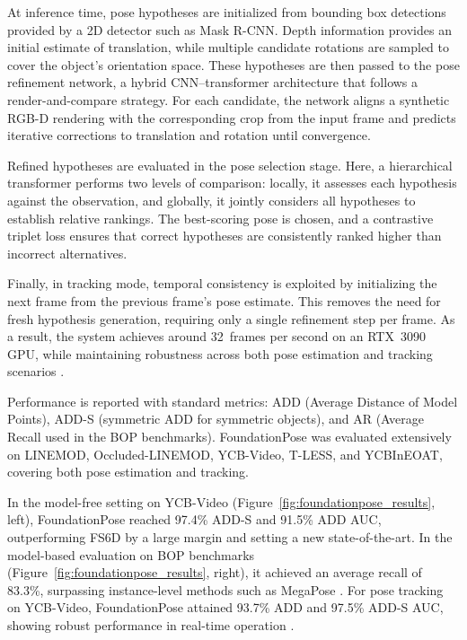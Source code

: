 At inference time, pose hypotheses are initialized from bounding box detections provided by a 2D detector such as Mask R-CNN. Depth information provides an initial estimate of translation, while multiple candidate rotations are sampled to cover the object’s orientation space. These hypotheses are then passed to the pose refinement network, a hybrid CNN–transformer architecture that follows a render-and-compare strategy. For each candidate, the network aligns a synthetic RGB-D rendering with the corresponding crop from the input frame and predicts iterative corrections to translation and rotation until convergence.  

Refined hypotheses are evaluated in the pose selection stage. Here, a hierarchical transformer performs two levels of comparison: locally, it assesses each hypothesis against the observation, and globally, it jointly considers all hypotheses to establish relative rankings. The best-scoring pose is chosen, and a contrastive triplet loss ensures that correct hypotheses are consistently ranked higher than incorrect alternatives.  

Finally, in tracking mode, temporal consistency is exploited by initializing the next frame from the previous frame’s pose estimate. This removes the need for fresh hypothesis generation, requiring only a single refinement step per frame. As a result, the system achieves around 32~frames per second on an RTX~3090 GPU, while maintaining robustness across both pose estimation and tracking scenarios \cite{wen2024foundationpose}.

Performance is reported with standard metrics: ADD (Average Distance of Model Points), ADD-S (symmetric ADD for symmetric objects), and AR (Average Recall used in the BOP benchmarks). FoundationPose was evaluated extensively on LINEMOD, Occluded-LINEMOD, YCB-Video, T-LESS, and YCBInEOAT, covering both pose estimation and tracking.

In the model-free setting on YCB-Video (Figure~\ref{fig:foundationpose_results}, left), FoundationPose reached 97.4\% ADD-S and 91.5\% ADD AUC, outperforming FS6D \cite{he2022fs6d} by a large margin and setting a new state-of-the-art. In the model-based evaluation on BOP benchmarks (Figure~\ref{fig:foundationpose_results}, right), it achieved an average recall of 83.3\%, surpassing instance-level methods such as MegaPose \cite{labbe2022megapose}. For pose tracking on YCB-Video, FoundationPose attained 93.7\% ADD and 97.5\% ADD-S AUC, showing robust performance in real-time operation \cite{wen2024foundationpose}.  

